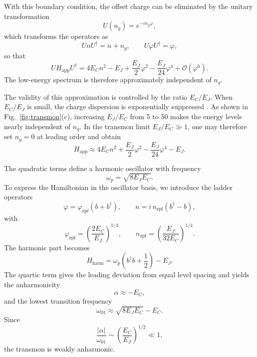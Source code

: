With this boundary condition, the offset charge can be eliminated by the unitary transformation
\begin{equation}
    U(n_g)=e^{-in_g\varphi},
\end{equation}
which transforms the operators as
\begin{equation}
    U n U^\dagger = n+n_g,
    \qquad
    U\varphi U^\dagger=\varphi,
\end{equation}
so that
\begin{equation}
    U H_{\mathrm{app}} U^\dagger
    =
    4E_C n^2
    - E_J
    + \frac{E_J}{2}\varphi^2
    - \frac{E_J}{24}\varphi^4
    + \mathcal{O}(\varphi^6).
\end{equation}
The low-energy spectrum is therefore approximately independent of \(n_g\).

The validity of this approximation is controlled by the ratio \(E_C/E_J\). When \(E_C/E_J\) is small, the charge dispersion is exponentially suppressed \cite{Koch2007}. As shown in Fig.~\ref{fig:transmon}(c), increasing \(E_J/E_C\) from 5 to 50 makes the energy levels nearly independent of \(n_g\). In the transmon limit \(E_J/E_C \gg 1\), one may therefore set \(n_g=0\) at leading order and obtain
\begin{equation}
    H_{\mathrm{app}}
    \approx
    4E_C n^2
    + \frac{E_J}{2}\varphi^2
    - \frac{E_J}{24}\varphi^4
    - E_J .
\end{equation}

The quadratic terms define a harmonic oscillator with frequency
\begin{equation}
    \omega_p = \sqrt{8E_JE_C}.
\end{equation}
To express the Hamiltonian in the oscillator basis, we introduce the ladder operators
\begin{equation}
    \varphi = \varphi_{\mathrm{zpf}}(b+b^\dagger),
    \qquad
    n = i\,n_{\mathrm{zpf}}(b^\dagger-b),
\end{equation}
with
\begin{equation}
    \varphi_{\mathrm{zpf}}=\left(\frac{2E_C}{E_J}\right)^{1/4},
    \qquad
    n_{\mathrm{zpf}}=\left(\frac{E_J}{32E_C}\right)^{1/4}.
\end{equation}
The harmonic part becomes
\begin{equation}
    H_{\mathrm{harm}}
    =
    \omega_p\left(b^\dagger b+\frac12\right)-E_J.
\end{equation}
The quartic term gives the leading deviation from equal level spacing and yields the anharmonicity
\begin{equation}
    \alpha \approx -E_C,
\end{equation}
and the lowest transition frequency
\begin{equation}
    \omega_{01}\approx \sqrt{8E_JE_C}-E_C.
\end{equation}
Since
\begin{equation}
    \frac{|\alpha|}{\omega_{01}}
    \sim
    \left(\frac{E_C}{E_J}\right)^{1/2}\ll 1,
\end{equation}
the transmon is weakly anharmonic.

